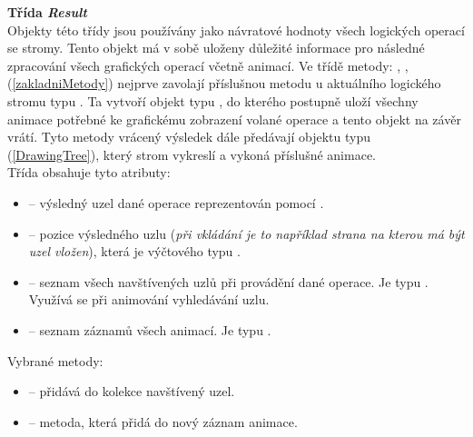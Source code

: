 \documentclass[
  biblatex=false,
  font=serif,
  glossaries=false,
  tables=false,
  theorems=false,
  index
]{kidiplom}
\begin{document}
\noindent \textbf{Třída \textit{Result}} \label{Result}\\
\indent Objekty této třídy jsou používány jako návratové hodnoty všech logických operací se stromy. Tento objekt má v sobě uloženy důležité informace pro následné zpracování všech grafických operací včetně animací. Ve třídě metody:  ,  ,  (\ref{zakladniMetody}) nejprve zavolají příslušnou metodu u aktuálního logického stromu typu . Ta vytvoří objekt typu , do kterého  postupně uloží všechny animace potřebné ke grafickému zobrazení volané operace a tento objekt na závěr vrátí. Tyto metody vrácený výsledek dále předávají objektu typu  (\ref{DrawingTree}), který strom vykreslí a vykoná příslušné animace.\\
\noindent Třída obsahuje tyto atributy: 
\begin{itemize}
\item {} -- výsledný uzel dané operace reprezentován pomocí .
\item {} -- pozice výsledného uzlu (\textit{při vkládání je to například strana na kterou má být uzel vložen}), která je výčtového typu . 
\item {} -- seznam všech navštívených uzlů při provádění dané operace. Je typu . Využívá se při animování vyhledávání uzlu. 
\item {} -- seznam záznamů všech animací. Je typu . 
\end{itemize}

\newpage
\noindent Vybrané metody:
\begin{itemize}
\item {} -- přidává do kolekce  navštívený uzel.

\item {} -- metoda, která přidá do  nový záznam animace.
\end{itemize}
\end{document}
